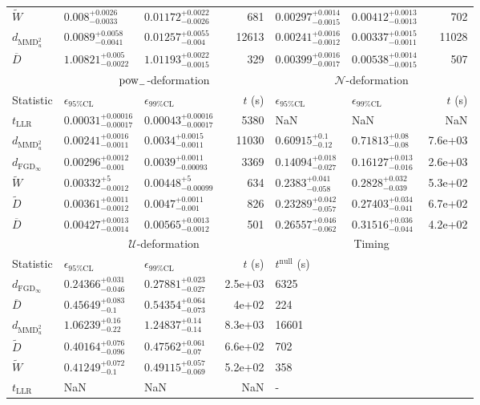 \begin{tabular}{l|llr|llr}
	$\widetilde{W}$ & $0.008_{-0.0033}^{+0.0026}$ & $0.01172_{-0.0026}^{+0.0022}$ & 681 & $0.00297_{-0.0015}^{+0.0014}$ & $0.00412_{-0.0013}^{+0.0013}$ & 702 \\
	$d_{\mathrm{MMD}^{2}_{u}}$ & $0.0089_{-0.0041}^{+0.0058}$ & $0.01257_{-0.004}^{+0.0055}$ & 12613 & $0.00241_{-0.0012}^{+0.0016}$ & $0.00337_{-0.0011}^{+0.0015}$ & 11028 \\
	$\overline{D}$ & $1.00821_{-0.0022}^{+0.005}$ & $1.01193_{-0.0015}^{+0.0022}$ & 329 & $0.00399_{-0.0017}^{+0.0016}$ & $0.00538_{-0.0015}^{+0.0014}$ & 507 \\
	\toprule
	\multicolumn{1}{c}{} & \multicolumn{3}{c}{$\rm{pow}_{-}$-deformation} & \multicolumn{3}{c}{$\mathcal{N}$-deformation} \\
	Statistic & $\epsilon_{95\%\mathrm{CL}}$ & $\epsilon_{99\%\mathrm{CL}}$ & $t$ (s) & $\epsilon_{95\%\mathrm{CL}}$ & $\epsilon_{99\%\mathrm{CL}}$ & $t$ (s) \\
	\midrule
	$t_{\mathrm{LLR}}$ & $0.00031_{-0.00017}^{+0.00016}$ & $0.00043_{-0.00017}^{+0.00016}$ & 5380 & NaN & NaN & NaN \\
	$d_{\mathrm{MMD}^{2}_{u}}$ & $0.00241_{-0.0011}^{+0.0016}$ & $0.0034_{-0.0011}^{+0.0015}$ & 11030 & $0.60915_{-0.12}^{+0.1}$ & $0.71813_{-0.08}^{+0.08}$ & 7.6e+03 \\
	$d_{\mathrm{FGD}_{\infty}}$ & $0.00296_{-0.001}^{+0.0012}$ & $0.0039_{-0.00093}^{+0.0011}$ & 3369 & $0.14094_{-0.027}^{+0.018}$ & $0.16127_{-0.016}^{+0.013}$ & 2.6e+03 \\
	$\widetilde{W}$ & $0.00332_{-0.0012}^{+5}$ & $0.00448_{-0.00099}^{+5}$ & 634 & $0.2383_{-0.058}^{+0.041}$ & $0.2828_{-0.039}^{+0.032}$ & 5.3e+02 \\
	$\widetilde{D}$ & $0.00361_{-0.0012}^{+0.0011}$ & $0.0047_{-0.001}^{+0.0011}$ & 826 & $0.23289_{-0.057}^{+0.042}$ & $0.27403_{-0.041}^{+0.034}$ & 6.7e+02 \\
	$\overline{D}$ & $0.00427_{-0.0014}^{+0.0013}$ & $0.00565_{-0.0012}^{+0.0013}$ & 501 & $0.26557_{-0.062}^{+0.046}$ & $0.31516_{-0.044}^{+0.036}$ & 4.2e+02 \\
	\toprule
	\multicolumn{1}{c}{} & \multicolumn{3}{c}{$\mathcal{U}$-deformation} & \multicolumn{3}{c}{Timing} \\
	Statistic & $\epsilon_{95\%\mathrm{CL}}$ & $\epsilon_{99\%\mathrm{CL}}$ & $t$ (s) & $t^{\mathrm{null}}$ (s) \\
	\midrule
	$d_{\mathrm{FGD}_{\infty}}$ & $0.24366_{-0.046}^{+0.031}$ & $0.27881_{-0.027}^{+0.023}$ & 2.5e+03 & 6325 \\
	$\overline{D}$ & $0.45649_{-0.1}^{+0.083}$ & $0.54354_{-0.073}^{+0.064}$ & 4e+02 & 224 \\
	$d_{\mathrm{MMD}^{2}_{u}}$ & $1.06239_{-0.22}^{+0.16}$ & $1.24837_{-0.14}^{+0.14}$ & 8.3e+03 & 16601 \\
	$\widetilde{D}$ & $0.40164_{-0.096}^{+0.076}$ & $0.47562_{-0.07}^{+0.061}$ & 6.6e+02 & 702 \\
	$\widetilde{W}$ & $0.41249_{-0.1}^{+0.072}$ & $0.49115_{-0.069}^{+0.057}$ & 5.2e+02 & 358 \\
	$t_{\mathrm{LLR}}$ & NaN & NaN & NaN & - \\
	\bottomrule
\end{tabular}